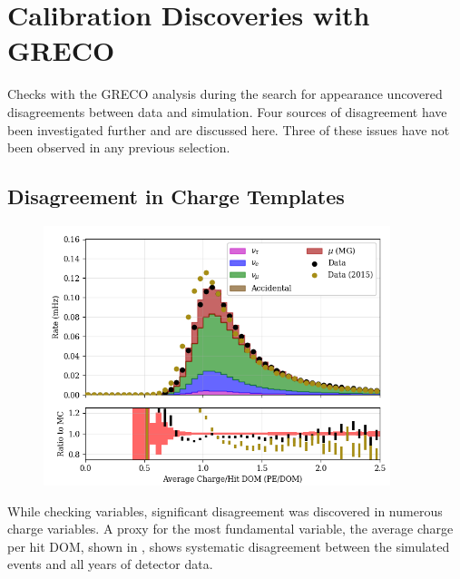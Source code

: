

















\graphicspath{{chapters/greco/images/}}
\label{sec:greco_discoveries}
\section{Calibration Discoveries with GRECO}
Checks with the GRECO analysis during the search for appearance uncovered disagreements between data and simulation.
Four sources of disagreement have been investigated further and are discussed here.
Three of these issues have not been observed in any previous selection.


\label{subsec:charge_templates}
\subsection{Disagreement in Charge Templates}

\begin{figure}
\includegraphics[width=0.9\textwidth]{L7_charge_per_channel.png} 
\end{figure}
While checking variables, significant disagreement was discovered in numerous charge variables.
A proxy for the most fundamental variable, the average charge per hit DOM, shown in , shows systematic disagreement between the simulated events and all years of detector data.

